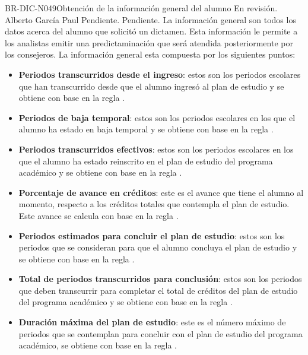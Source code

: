 \begin{BusinessRule}{BR-DIC-N049}{Obtención de la información general del alumno}
	{\bcCondition} %
	{\btTimer}     %
	{\blInfluencing}     %
	\BRItem[Estado] En revisión.
	  Alberto García Paul
	 Pendiente.
	 Pendiente.
	\BRItem[Descripción] La información general son todos los datos acerca del alumno que solicitó un dictamen. Esta información le permite a los analistas emitir una predictaminación que será atendida posteriormente por los consejeros. La información general esta compuesta por los siguientes puntos:
	\begin{itemize}
		\item \textbf{Periodos transcurridos desde el ingreso}: estos son los periodos escolares que han transcurrido desde que el alumno ingresó al plan de estudio y se obtiene con base en la regla .
		\item \textbf{Periodos de baja temporal}: estos son los periodos escolares en los que el alumno ha estado en baja temporal y se obtiene con base en la regla .
		\item \textbf{Periodos transcurridos efectivos}: estos son los periodos escolares en los que el alumno ha estado reinscrito en el plan de estudio del programa académico y se obtiene con base en la regla .
		\item \textbf{Porcentaje de avance en créditos}: este es el avance que tiene el alumno al momento, respecto a los créditos totales que contempla el plan de estudio. Este avance se calcula con base en la regla .
		\item \textbf{Periodos estimados para concluir el plan de estudio}: estos son los periodos que se consideran para que el alumno concluya el plan de estudio y se obtiene con base en la regla .
		\item \textbf{Total de periodos transcurridos para conclusión}: estos son los periodos que deben transcurrir para completar el total de créditos del plan de estudio del programa académico y se obtiene con base en la regla .
		\item \textbf{Duración máxima del plan de estudio}: este es el número máximo de periodos que se contemplan para concluir con el plan de estudio del programa académico, se obtiene con base en la regla .

\end{itemize}
\end{BusinessRule}
